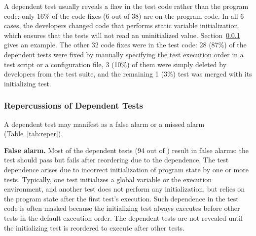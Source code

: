 
A dependent test usually
reveals a flaw in the test code rather than the program code:
only 16\% of the code fixes (6 out of 38) are
on the program code.
In all 6 cases, the developers changed
code that performs static variable initialization, which ensures that
the tests will not read an uninitialized value.
Section~\ref{sec:repercussion} gives an example.
The other 32 code fixes were in the test code:
28 (87\%) of the dependent tests were fixed by manually specifying
the test execution order in a test script or a configuration file,
3 (10\%) of them were simply deleted by developers
from the test suite, and the remaining 1 (3\%) test was merged with its
initializing test.








\subsubsection{Repercussions of Dependent Tests}
\label{sec:repercussion}



A dependent test may manifest as a false alarm or a missed alarm
(Table~\ref{tab:reper}).

\tinyrelax
\noindent \textbf{False alarm.} Most of
the dependent tests (94 out of \dtnum) 
result in false alarms:
the test should pass but fails after reordering due to the dependence.
The test dependence arises due to incorrect initialization
of program state by one
or more tests. Typically, one test initializes
a global variable or the execution environment, and another
test does not perform any initialization, but
relies on the program state after the first test's execution.
Such dependence in the test code is often masked because
the initializing test always executes before other tests in the
default execution order. The dependent tests are not revealed
until the initializing test is reordered to execute
after other tests. 


